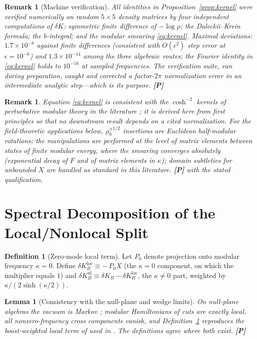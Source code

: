 \documentclass[11pt]{article}
\newtheorem{lemma}[theorem]{Lemma}
\newtheorem{remark}[theorem]{Remark}
\theoremstyle{definition}
\newtheorem{definition}[theorem]{Definition}
\newcommand{\pP}{\textbf{[P]}}
\begin{document}
\begin{remark}[Machine verification]
\label{rem:verification}
All identities in Proposition~\ref{prop:kernel} were verified numerically
on random $5\times5$ density matrices by four independent computations of
$\delta K$: symmetric finite difference of $-\log\rho$; the
Daleckii--Krein formula; the $b$-integral; and the modular smearing
\eqref{eq:kernel}. Maximal deviations: $1.7\times10^{-8}$ against finite
differences (consistent with $O(\epsilon^2)$ step error at
$\epsilon=10^{-6}$) and $1.3\times10^{-14}$ among the three algebraic
routes; the Fourier identity in \eqref{eq:kernel} holds to $10^{-16}$ at
sampled frequencies. The verification suite, run during preparation,
caught and corrected a factor-$2\pi$ normalization error in an
intermediate analytic step---which is its purpose. \pP{}
\end{remark}

\begin{remark}
Equation \eqref{eq:kernel} is consistent with the $\cosh^{-2}$ kernels of
perturbative modular theory in the literature
\cite{SarosiUgajin2018,Lashkari2016,FLPW2016}; it is derived here from
first principles so that no downstream result depends on a cited
normalization. For the field-theoretic applications below,
$\rho_0^{\pm1/2}$ insertions are Euclidean half-modular rotations; the
manipulations are performed at the level of matrix elements between states
of finite modular energy, where the smearing converges absolutely
(exponential decay of $F$ and of matrix elements in $\kappa$); domain
subtleties for unbounded $X$ are handled as standard in this literature.
\pP{} with the stated qualification.
\end{remark}

\section{Spectral Decomposition of the Local/Nonlocal Split}

\begin{definition}[Zero-mode local term]
\label{def:zeromode}
Let $P_0$ denote projection onto modular frequency $\kappa=0$. Define
$\delta K_B^{\mathrm{loc}}\equiv-\,P_0X$ (the $\kappa=0$ component, on
which the multiplier equals $1$) and
$\delta K_B^{\mathrm{nl}}\equiv\delta K_B-\delta K_B^{\mathrm{loc}}$, the
$\kappa\neq0$ part, weighted by $\kappa/(2\sinh(\kappa/2))$.
\end{definition}

\begin{lemma}[Consistency with the null-plane and wedge limits]
On null-plane algebras the vacuum is Markov
\cite{CasiniTesteTorroba2017}; modular Hamiltonians of cuts are exactly
local, all nonzero-frequency cross components vanish, and
Definition~\ref{def:zeromode} reproduces the boost-weighted local term of
\cite{FLPW2016} used in \cite{McGwier2026b}. The definitions agree where
both exist. \pP{}
\end{lemma}
\end{document}
